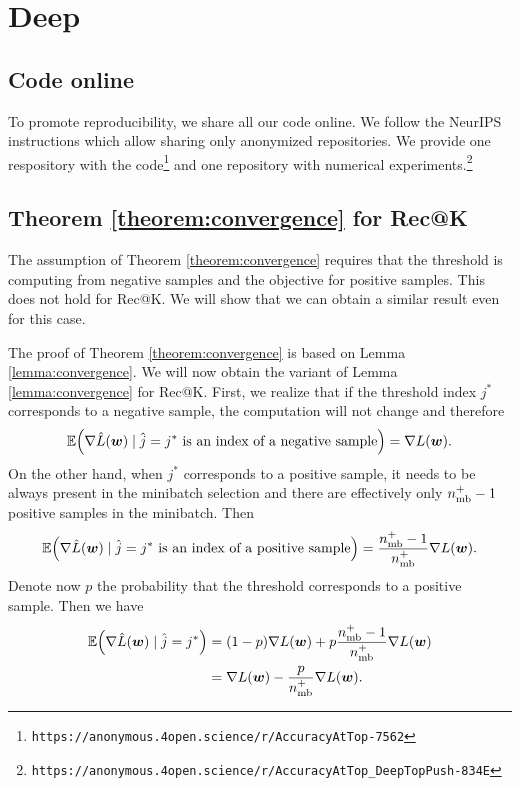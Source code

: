 \chapter{Deep}
\section{Code online}

To promote reproducibility, we share all our code online. We follow the NeurIPS instructions which allow sharing only anonymized repositories. We provide one respository with the code\footnote{\texttt{https://anonymous.4open.science/r/AccuracyAtTop-7562}} and one repository with numerical experiments.\footnote{\texttt{https://anonymous.4open.science/r/AccuracyAtTop\_DeepTopPush-834E}}

\section{Theorem \ref{theorem:convergence} for Rec@K}

The assumption of Theorem \ref{theorem:convergence} requires that the threshold is computing from negative samples and the objective for positive samples. This does not hold for Rec@K. We will show that we can obtain a similar result even for this case.

The proof of Theorem \ref{theorem:convergence} is based on Lemma \ref{lemma:convergence}. We will now obtain the variant of Lemma \ref{lemma:convergence} for Rec@K. First, we realize that if the threshold index $j^*$ corresponds to a negative sample, the computation will not change and therefore
\begin{equation*}
  \EE\Brac{\nabla \hat L(\bm w) \mid \hat j=j^*\text{ is an index of a negative sample}}
  =  \nabla L(\bm w).
\end{equation*}
On the other hand, when $j^*$ corresponds to a positive sample, it needs to be always present in the minibatch selection and there are effectively only $n_{\rm mb}^+-1$ positive samples in the minibatch. Then
\begin{equation*}
  \EE\Brac{\nabla \hat L(\bm w) \mid \hat j=j^*\text{ is an index of a positive sample}}
  = \frac{\nmin^+-1}{\nmin^+}\nabla L(\bm w).
\end{equation*}
Denote now $p$ the probability that the threshold corresponds to a positive sample. Then we have
\begin{equation*}
  \begin{aligned}
    \EE\Brac{\nabla \hat L(\bm w) \mid \hat j=j^*}
    & = (1-p)\nabla L(\bm w) + p\frac{\nmin^+-1}{\nmin^+}\nabla L(\bm w) \\
    & = \nabla L(\bm w) - \frac{p}{\nmin^+}\nabla L(\bm w).
\end{aligned}
\end{equation*}

